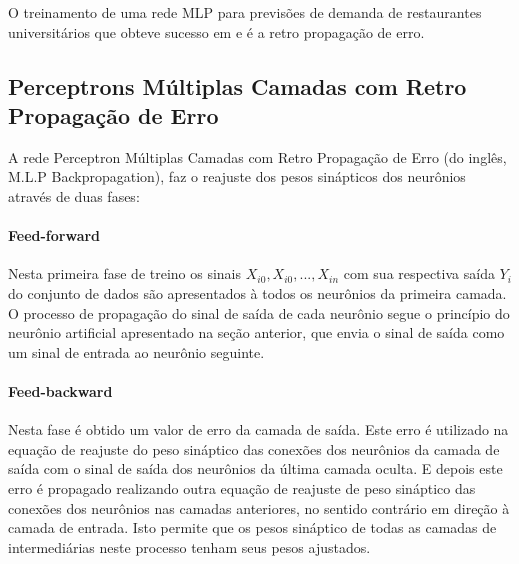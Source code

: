 \documentclass[	12pt, Times, openright, twoside, a4paper, english, brazil]{abntex2}
\begin{document}
        O treinamento de uma rede MLP para previsões de demanda de restaurantes universitários que obteve sucesso em \cite{Lopes2008} e \cite{Rocha2011} é a retro propagação de erro.
        \subsection{Perceptrons Múltiplas Camadas com Retro Propagação de Erro}
        A rede Perceptron Múltiplas Camadas com Retro Propagação de Erro (do inglês, M.L.P Backpropagation), faz o reajuste dos pesos sinápticos dos neurônios através de duas fases:
  	       \paragraph*{Feed-forward} Nesta primeira fase de treino os sinais $X_{i0},X_{i0},...,X_{in}$ com sua respectiva saída $Y_i$ do conjunto de dados são apresentados à todos os neurônios da primeira camada. O processo de propagação do sinal de saída de cada neurônio segue o princípio do neurônio artificial apresentado na seção anterior, que envia o sinal de saída como um sinal de entrada ao neurônio seguinte.
  	       
  	       \paragraph*{Feed-backward} Nesta fase é obtido um valor de erro da camada de saída. Este erro é utilizado na equação de reajuste do peso sináptico das conexões dos neurônios da camada de saída com o sinal de saída dos neurônios da última camada oculta. E depois este erro é propagado realizando outra equação de reajuste de peso sináptico das conexões dos neurônios nas camadas anteriores, no sentido contrário em direção à camada de entrada. Isto permite que os pesos sináptico de todas as camadas de intermediárias neste processo tenham seus pesos ajustados.
  	       
  	       \begin{figure}[H]
  	       \end{figure}
  	       
\end{document}
